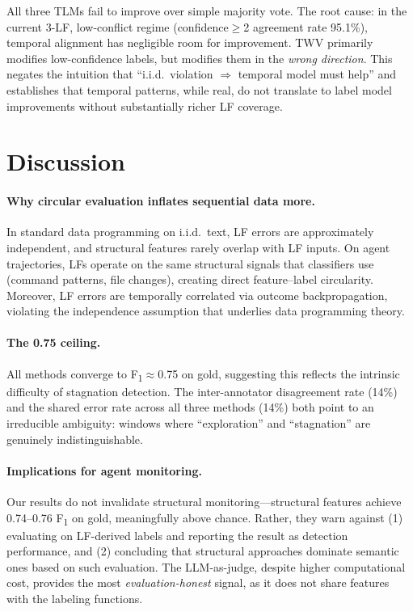 \documentclass[11pt,a4paper]{article}
\newcommand{\fone}{F\textsubscript{1}}
\begin{document}
All three TLMs fail to improve over simple majority vote.
The root cause: in the current 3-LF, low-conflict regime (confidence$\geq$2 agreement rate 95.1\%), temporal alignment has negligible room for improvement.
TWV primarily modifies low-confidence labels, but modifies them in the \emph{wrong direction}.
This negates the intuition that ``i.i.d.\ violation $\Rightarrow$ temporal model must help'' and establishes that temporal patterns, while real, do not translate to label model improvements without substantially richer LF coverage.

\section{Discussion}
\label{sec:discussion}

\paragraph{Why circular evaluation inflates sequential data more.}
In standard data programming on i.i.d.\ text, LF errors are approximately independent, and structural features rarely overlap with LF inputs.
On agent trajectories, LFs operate on the same structural signals that classifiers use (command patterns, file changes), creating direct feature--label circularity.
Moreover, LF errors are temporally correlated via outcome backpropagation, violating the independence assumption that underlies data programming theory.

\paragraph{The 0.75 ceiling.}
All methods converge to \fone{}$\approx$0.75 on gold, suggesting this reflects the intrinsic difficulty of stagnation detection.
The inter-annotator disagreement rate (14\%) and the shared error rate across all three methods (14\%) both point to an irreducible ambiguity: windows where ``exploration'' and ``stagnation'' are genuinely indistinguishable.

\paragraph{Implications for agent monitoring.}
Our results do not invalidate structural monitoring---structural features achieve 0.74--0.76 \fone{} on gold, meaningfully above chance.
Rather, they warn against (1) evaluating on LF-derived labels and reporting the result as detection performance, and (2) concluding that structural approaches dominate semantic ones based on such evaluation.
The LLM-as-judge, despite higher computational cost, provides the most \emph{evaluation-honest} signal, as it does not share features with the labeling functions.
\end{document}
